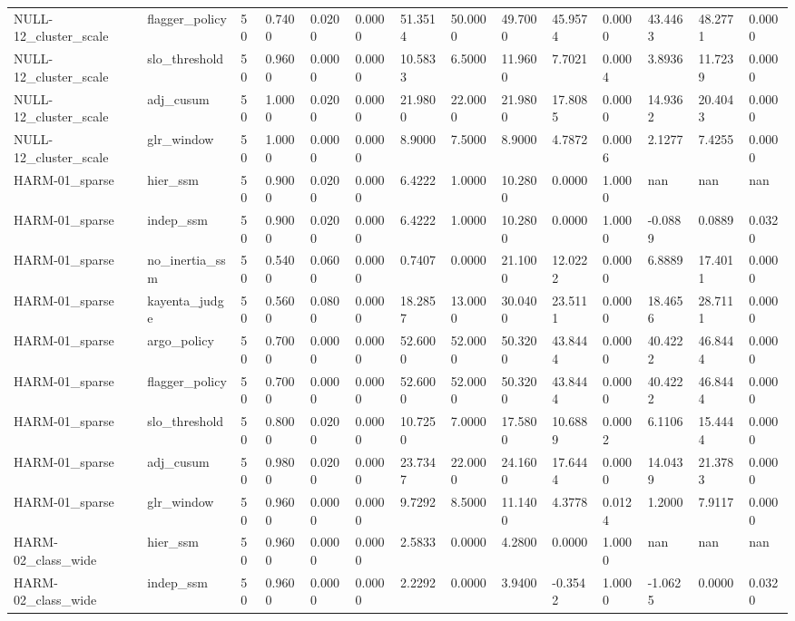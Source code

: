 \begin{table}[htbp]
\begin{tabular}{llllllllllllll}
NULL-12\_cluster\_scale & flagger\_policy & 50 & 0.7400 & 0.0200 & 0.0000 & 51.3514 & 50.0000 & 49.7000 & 45.9574 & 0.0000 & 43.4463 & 48.2771 & 0.0000 \\
NULL-12\_cluster\_scale & slo\_threshold & 50 & 0.9600 & 0.0000 & 0.0000 & 10.5833 & 6.5000 & 11.9600 & 7.7021 & 0.0004 & 3.8936 & 11.7239 & 0.0000 \\
NULL-12\_cluster\_scale & adj\_cusum & 50 & 1.0000 & 0.0200 & 0.0000 & 21.9800 & 22.0000 & 21.9800 & 17.8085 & 0.0000 & 14.9362 & 20.4043 & 0.0000 \\
NULL-12\_cluster\_scale & glr\_window & 50 & 1.0000 & 0.0000 & 0.0000 & 8.9000 & 7.5000 & 8.9000 & 4.7872 & 0.0006 & 2.1277 & 7.4255 & 0.0000 \\
HARM-01\_sparse & hier\_ssm & 50 & 0.9000 & 0.0200 & 0.0000 & 6.4222 & 1.0000 & 10.2800 & 0.0000 & 1.0000 & nan & nan & nan \\
HARM-01\_sparse & indep\_ssm & 50 & 0.9000 & 0.0200 & 0.0000 & 6.4222 & 1.0000 & 10.2800 & 0.0000 & 1.0000 & -0.0889 & 0.0889 & 0.0320 \\
HARM-01\_sparse & no\_inertia\_ssm & 50 & 0.5400 & 0.0600 & 0.0000 & 0.7407 & 0.0000 & 21.1000 & 12.0222 & 0.0000 & 6.8889 & 17.4011 & 0.0000 \\
HARM-01\_sparse & kayenta\_judge & 50 & 0.5600 & 0.0800 & 0.0000 & 18.2857 & 13.0000 & 30.0400 & 23.5111 & 0.0000 & 18.4656 & 28.7111 & 0.0000 \\
HARM-01\_sparse & argo\_policy & 50 & 0.7000 & 0.0000 & 0.0000 & 52.6000 & 52.0000 & 50.3200 & 43.8444 & 0.0000 & 40.4222 & 46.8444 & 0.0000 \\
HARM-01\_sparse & flagger\_policy & 50 & 0.7000 & 0.0000 & 0.0000 & 52.6000 & 52.0000 & 50.3200 & 43.8444 & 0.0000 & 40.4222 & 46.8444 & 0.0000 \\
HARM-01\_sparse & slo\_threshold & 50 & 0.8000 & 0.0200 & 0.0000 & 10.7250 & 7.0000 & 17.5800 & 10.6889 & 0.0002 & 6.1106 & 15.4444 & 0.0000 \\
HARM-01\_sparse & adj\_cusum & 50 & 0.9800 & 0.0200 & 0.0000 & 23.7347 & 22.0000 & 24.1600 & 17.6444 & 0.0000 & 14.0439 & 21.3783 & 0.0000 \\
HARM-01\_sparse & glr\_window & 50 & 0.9600 & 0.0000 & 0.0000 & 9.7292 & 8.5000 & 11.1400 & 4.3778 & 0.0124 & 1.2000 & 7.9117 & 0.0000 \\
HARM-02\_class\_wide & hier\_ssm & 50 & 0.9600 & 0.0000 & 0.0000 & 2.5833 & 0.0000 & 4.2800 & 0.0000 & 1.0000 & nan & nan & nan \\
HARM-02\_class\_wide & indep\_ssm & 50 & 0.9600 & 0.0000 & 0.0000 & 2.2292 & 0.0000 & 3.9400 & -0.3542 & 1.0000 & -1.0625 & 0.0000 & 0.0320 \\

\end{tabular}
\end{table}
